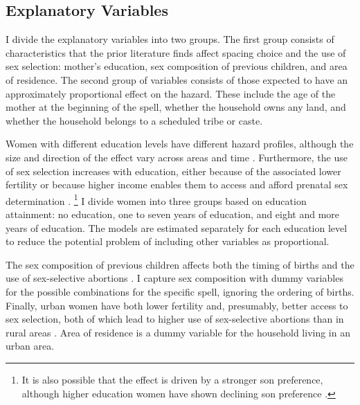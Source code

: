 \documentclass[12pt,letterpaper]{article}
\begin{document}
\subsection{Explanatory Variables}

I divide the explanatory variables into two groups.
The first group consists of characteristics that the prior literature finds affect 
spacing choice and the use of sex selection:
mother's education, sex composition of previous children, and area of residence.
The second group of variables consists of those expected to have an approximately 
proportional effect on the hazard.
These include the age of the mother at the beginning of the spell, whether the household 
owns any land, and whether the household belongs to a scheduled tribe or caste.

Women with different education levels have different hazard profiles, although the size 
and direction of the effect vary across areas and time 
\citep{Tulasidhar1993,Whitworth2002,Bhalotra2008,Kim2010,Soest2018}.
Furthermore, the use of sex selection increases with education, either because of the 
associated lower fertility or because higher income enables them to access and
afford prenatal sex determination
\citep{das_gupta97,retherford03b,Guilmoto2009a,Bongaarts2013,Portner2015b,Jayachandran2017}.%
\footnote{
It is also possible that the effect is driven by a stronger son preference, although 
higher education women have shown declining son preference \citep{bhat03,pande07}.
}
I divide women into three groups based on education attainment: no
education, one to seven years of education, and eight and more years of education.
The models are estimated separately for each education level to reduce the potential 
problem of including other variables as proportional.

The sex composition of previous children affects both the timing of births and the use of 
sex-selective abortions 
\citep{retherford03b,Bhalotra2008,Portner2015b,Soest2018}.
I capture sex composition with dummy variables for the
possible combinations for the specific spell, ignoring the ordering of births.
Finally, urban women have both lower fertility and, presumably, better access to
sex selection, both of which lead to higher use of sex-selective abortions than in 
rural areas \citep{retherford03b,Portner2015b}.
Area of residence is a dummy variable for the household living in an urban area.

\end{document}
